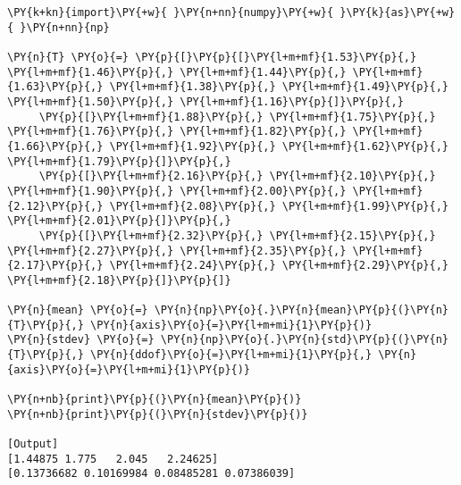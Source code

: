 \begin{Verbatim}[label=\makebox{\href{https://github.com/unipi-physics-labs/lab1-notes/tree/main/snippy/sample_stat_numpy_vec.py}{https://github.com/.../sample\_stat\_numpy\_vec.py}},commandchars=\\\{\}]
\PY{k+kn}{import}\PY{+w}{ }\PY{n+nn}{numpy}\PY{+w}{ }\PY{k}{as}\PY{+w}{ }\PY{n+nn}{np}

\PY{n}{T} \PY{o}{=} \PY{p}{[}\PY{p}{[}\PY{l+m+mf}{1.53}\PY{p}{,} \PY{l+m+mf}{1.46}\PY{p}{,} \PY{l+m+mf}{1.44}\PY{p}{,} \PY{l+m+mf}{1.63}\PY{p}{,} \PY{l+m+mf}{1.38}\PY{p}{,} \PY{l+m+mf}{1.49}\PY{p}{,} \PY{l+m+mf}{1.50}\PY{p}{,} \PY{l+m+mf}{1.16}\PY{p}{]}\PY{p}{,}
     \PY{p}{[}\PY{l+m+mf}{1.88}\PY{p}{,} \PY{l+m+mf}{1.75}\PY{p}{,} \PY{l+m+mf}{1.76}\PY{p}{,} \PY{l+m+mf}{1.82}\PY{p}{,} \PY{l+m+mf}{1.66}\PY{p}{,} \PY{l+m+mf}{1.92}\PY{p}{,} \PY{l+m+mf}{1.62}\PY{p}{,} \PY{l+m+mf}{1.79}\PY{p}{]}\PY{p}{,}
     \PY{p}{[}\PY{l+m+mf}{2.16}\PY{p}{,} \PY{l+m+mf}{2.10}\PY{p}{,} \PY{l+m+mf}{1.90}\PY{p}{,} \PY{l+m+mf}{2.00}\PY{p}{,} \PY{l+m+mf}{2.12}\PY{p}{,} \PY{l+m+mf}{2.08}\PY{p}{,} \PY{l+m+mf}{1.99}\PY{p}{,} \PY{l+m+mf}{2.01}\PY{p}{]}\PY{p}{,}
     \PY{p}{[}\PY{l+m+mf}{2.32}\PY{p}{,} \PY{l+m+mf}{2.15}\PY{p}{,} \PY{l+m+mf}{2.27}\PY{p}{,} \PY{l+m+mf}{2.35}\PY{p}{,} \PY{l+m+mf}{2.17}\PY{p}{,} \PY{l+m+mf}{2.24}\PY{p}{,} \PY{l+m+mf}{2.29}\PY{p}{,} \PY{l+m+mf}{2.18}\PY{p}{]}\PY{p}{]}

\PY{n}{mean} \PY{o}{=} \PY{n}{np}\PY{o}{.}\PY{n}{mean}\PY{p}{(}\PY{n}{T}\PY{p}{,} \PY{n}{axis}\PY{o}{=}\PY{l+m+mi}{1}\PY{p}{)}
\PY{n}{stdev} \PY{o}{=} \PY{n}{np}\PY{o}{.}\PY{n}{std}\PY{p}{(}\PY{n}{T}\PY{p}{,} \PY{n}{ddof}\PY{o}{=}\PY{l+m+mi}{1}\PY{p}{,} \PY{n}{axis}\PY{o}{=}\PY{l+m+mi}{1}\PY{p}{)}

\PY{n+nb}{print}\PY{p}{(}\PY{n}{mean}\PY{p}{)}
\PY{n+nb}{print}\PY{p}{(}\PY{n}{stdev}\PY{p}{)}

[Output]
[1.44875 1.775   2.045   2.24625]
[0.13736682 0.10169984 0.08485281 0.07386039]
\end{Verbatim}
